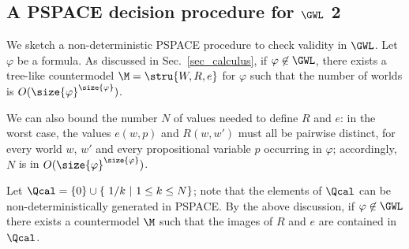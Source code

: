 








\subsection{A PSPACE decision procedure for $\GWL$ 2}\label{app:pspace}


We sketch a non-deterministic PSPACE procedure to check validity in
$\GWL$. Let $\varphi$ be a formula. As discussed in
Sec.~\ref{sec_calculus}, if $\varphi\not\in\GWL$, there exists a
tree-like countermodel $\M=\stru{W,R,e}$ for $\varphi$ such that the
number of worlds is $O(\size{\varphi}^{\size{\varphi}})$.  

We can also bound the number $N$ of values needed to define $R$ and
$e$: in the worst case, the values $e(w,p)$ and $R(w,w')$ must all be
pairwise distinct, for every world $w$, $w'$ and every propositional
variable $p$ occurring in $\varphi$; accordingly, $N$ is in
$O(\size{\varphi}^{\size{\varphi}})$.  

Let $\Qcal=\{0\}\cup\{~1/k~|~1\leq k\leq N\}$; note that the elements
of $\Qcal$ can be non-deterministically generated in PSPACE.  By the
above discussion, if $\varphi\not\in\GWL$ there exists a countermodel
$\M$ such that the images of $R$ and $e$ are contained in $\Qcal$.  

